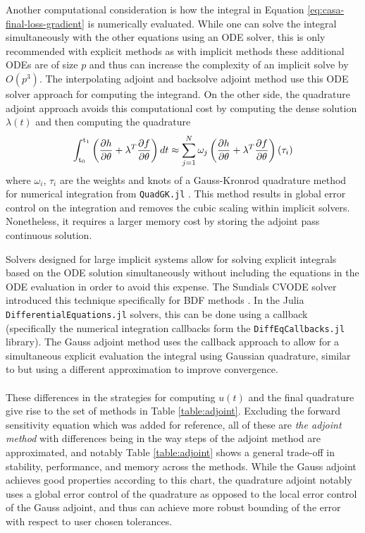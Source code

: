 Another computational consideration is how the integral in Equation \eqref{eq:casa-final-loss-gradient} is numerically evaluated. 
While one can solve the integral simultaneously with the other equations using an ODE solver, this is only recommended with explicit methods as with implicit methods these additional ODEs are of size $p$ and thus can increase the complexity of an implicit solve by $O(p^3)$. 
The interpolating adjoint and backsolve adjoint method use this ODE solver approach for computing the integrand. 
On the other side, the quadrature adjoint approach avoids this computational cost by computing the dense solution $\lambda(t)$ and then computing the quadrature 
\begin{equation}
    \operatorname{\int_{t_0}^{t_1}}
    \left( \frac{\partial h}{\partial \theta} + \lambda^T \frac{\partial f}{\partial \theta} \right) dt 
    \approx
    \sum_{j=1}^N \omega_j \left( \frac{\partial h}{\partial \theta} + \lambda^T \frac{\partial f}{\partial \theta} \right) (\tau_i)
\end{equation}
where $\omega_i$, $\tau_i$ are the weights and knots of a Gauss-Kronrod quadrature method for numerical integration from \texttt{QuadGK.jl} \cite{laurie1997calculation, gonnet2012review}. 
This method results in global error control on the integration and removes the cubic scaling within implicit solvers. Nonetheless, it requires a larger memory cost by storing the adjoint pass continuous solution.

Solvers designed for large implicit systems allow for solving explicit integrals based on the ODE solution simultaneously without including the equations in the ODE evaluation in order to avoid this expense. 
The Sundials CVODE solver introduced this technique specifically for BDF methods \cite{SUNDIALS-hindmarsh2005sundials}. 
In the Julia \texttt{DifferentialEquations.jl} solvers, this can be done using a callback (specifically the numerical integration callbacks form the \texttt{DiffEqCallbacks.jl} library). 
The Gauss adjoint method uses the callback approach to allow for a simultaneous explicit evaluation the integral using Gaussian quadrature, similar to \cite{Norcliffe_gaussquadrature_2023} but using a different approximation to improve convergence.
\\ \\ 
These differences in the strategies for computing $u(t)$ and the final quadrature give rise to the set of methods in Table \ref{table:adjoint}. 
Excluding the forward sensitivity equation which was added for reference, all of these are \textit{the adjoint method} with differences being in the way steps of the adjoint method are approximated, and notably Table \ref{table:adjoint} shows a general trade-off in stability, performance, and memory across the methods. 
While the Gauss adjoint achieves good properties according to this chart, the quadrature adjoint notably uses a global error control of the quadrature as opposed to the local error control of the Gauss adjoint, and thus can achieve more robust bounding of the error with respect to user chosen tolerances.

